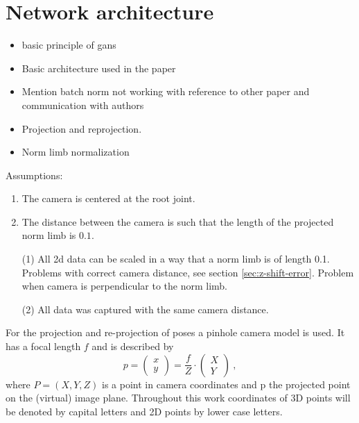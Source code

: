\section{Network architecture}\label{sec:network}
\begin{itemize}
	\item basic principle of gans
	\item Basic architecture used in the paper
	\item Mention batch norm not working with reference to other paper and communication with authors
	\item Projection and reprojection.
	\item Norm limb normalization
\end{itemize}

Assumptions:
\begin{enumerate}
	\item The camera is centered at the root joint.
	\item The distance between the camera is such that the length of the projected norm limb is $0.1$. 
\end{enumerate}
\begin{itemize}
	\item[(1)] All 2d data can be scaled in a way that a norm limb is of length 0.1. 
	Problems with correct camera distance, see section \ref{sec:z-shift-error}. 
	Problem when camera is perpendicular to the norm limb.
	\item[(2)] All data was captured with the same camera distance.
\end{itemize}

For the projection and re-projection of poses a pinhole camera model is used.
It has a focal length $f$ and is described by
\begin{equation}
	p = 
	\begin{pmatrix}
	x\\
	y
	\end{pmatrix}
	= \frac{f}{Z} \cdot 	
	\begin{pmatrix}
	X\\
	Y
	\end{pmatrix} \ ,
\end{equation}
where $P = (X, Y, Z)$ is a point in camera coordinates and p the projected point on the (virtual) image plane.
Throughout this work coordinates of 3D points will be denoted by capital letters and 2D points by lower case letters.


